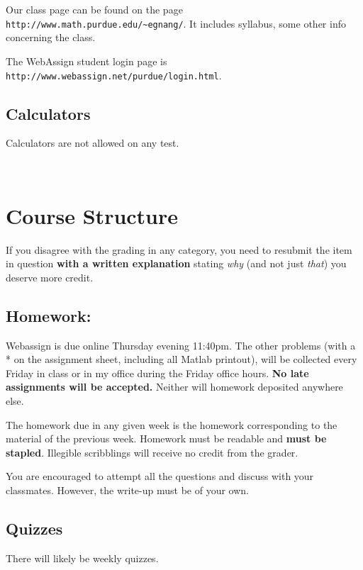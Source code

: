 \documentclass[10pt]{article}
\begin{document}
\noindent Our class page can be found on the page {\tt
http://www.math.purdue.edu/\~{}egnang/}. It includes
syllabus, some other info concerning the class. \smallskip


\noindent The WebAssign student login page is {\tt http://www.webassign.net/purdue/login.html}.



\subsection{Calculators}
Calculators are not allowed on any test.

\newpage 
~
\vspace{-3cm}
\section{Course Structure}

If you disagree with the grading in any category, you need to resubmit
the item in question {\bf with a written explanation} stating {\em why}
(and not just {\em that}) you deserve more credit. 
\subsection{Homework:}   
        Webassign is due online Thursday evening 11:40pm.  The
        other problems (with a * on the assignment sheet, including
        all Matlab printout), will be collected every Friday in
        class or in my office during the Friday office hours.  
        {\bf No late assignments will be accepted.}  Neither will 
        homework deposited anywhere else.

	The homework due in any given week is the
	homework corresponding to the material of the previous
	week. Homework must be readable and {\bf must be stapled}. Illegible
	scribblings will receive no credit from the grader.

        You are encouraged to attempt all the questions and discuss
        with your classmates. However, the write-up must
        be of your own.

\subsection{Quizzes}
There will likely be weekly quizzes.
\end{document}
